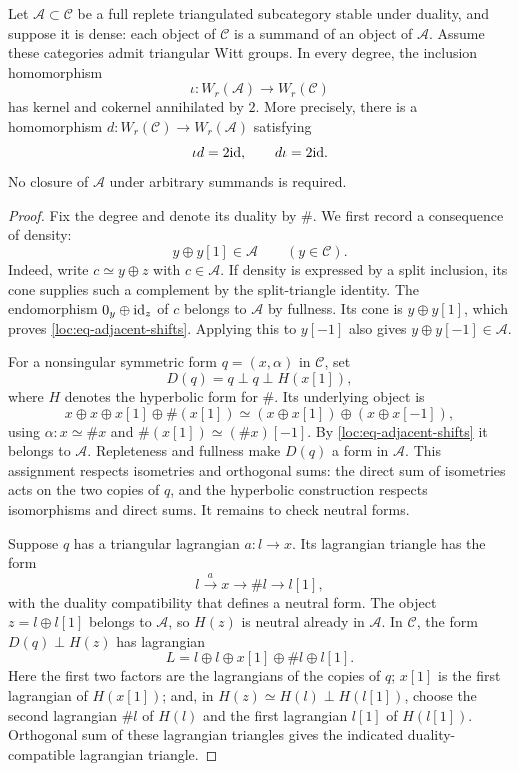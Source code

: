 \begin{theorem}
\label{thm:dense-doubling}
Let $\mathcal A\subset\mathcal C$ be a full replete triangulated
subcategory stable under duality, and suppose it is dense: each object
of $\mathcal C$ is a summand of an object of $\mathcal A$.
Assume these categories admit triangular Witt groups.  In every degree,
the inclusion homomorphism
\[
 \iota:W_r(\mathcal A)\longrightarrow W_r(\mathcal C)
\]
has kernel and cokernel annihilated by $2$.  More precisely, there is
a homomorphism
$d:W_r(\mathcal C)\to W_r(\mathcal A)$ satisfying
\[
 \iota d=2\mathrm{id},
 \qquad d\iota=2\mathrm{id}.
\]
No closure of $\mathcal A$ under arbitrary summands is required.
\end{theorem}

\begin{proof}
Fix the degree and denote its duality by $\#$.  We first record a
consequence of density:
\begin{equation}
\label{loc:eq-adjacent-shifts}
 y\oplus y[1]\in\mathcal A
 \qquad(y\in\mathcal C).
\end{equation}
Indeed, write $c\simeq y\oplus z$ with $c\in\mathcal A$.
If density is expressed by a split inclusion, its cone supplies such
a complement by the split-triangle identity.  The endomorphism
$0_y\oplus\mathrm{id}_z$ of $c$ belongs to $\mathcal A$ by fullness.
Its cone is $y\oplus y[1]$, which proves
\eqref{loc:eq-adjacent-shifts}.  Applying this to $y[-1]$ also gives
$y\oplus y[-1]\in\mathcal A$.

For a nonsingular symmetric form $q=(x,\alpha)$ in $\mathcal C$, set
\begin{equation}
\label{loc:eq-doubling-form}
 D(q)=q\perp q\perp H(x[1]),
\end{equation}
where $H$ denotes the hyperbolic form for $\#$.  Its underlying object
is
\[
 x\oplus x\oplus x[1]\oplus\#(x[1])
 \simeq (x\oplus x[1])\oplus(x\oplus x[-1]),
\]
using $\alpha:x\simeq\#x$ and
$\#(x[1])\simeq(\#x)[-1]$.
By \eqref{loc:eq-adjacent-shifts} it belongs to $\mathcal A$.
Repleteness and fullness make $D(q)$ a form in $\mathcal A$.
This assignment respects isometries and orthogonal sums: the direct
sum of isometries acts on the two copies of $q$, and the hyperbolic
construction respects isomorphisms and direct sums.  It remains to
check neutral forms.

Suppose $q$ has a triangular lagrangian $a:l\to x$.  Its lagrangian
triangle has the form
\[
 l\xrightarrow{a}x\longrightarrow\#l\longrightarrow l[1],
\]
with the duality compatibility that defines a neutral form.
The object $z=l\oplus l[1]$ belongs to $\mathcal A$, so $H(z)$ is
neutral already in $\mathcal A$.  In $\mathcal C$, the form
$D(q)\perp H(z)$ has lagrangian
\begin{equation}
\label{loc:eq-doubled-lagrangian}
 L=l\oplus l\oplus x[1]\oplus\#l\oplus l[1].
\end{equation}
Here the first two factors are the lagrangians of the copies of $q$;
$x[1]$ is the first lagrangian of $H(x[1])$; and, in
$H(z)\simeq H(l)\perp H(l[1])$, choose the second lagrangian $\#l$
of $H(l)$ and the first lagrangian $l[1]$ of $H(l[1])$.
Orthogonal sum of these lagrangian triangles gives the indicated
duality-compatible lagrangian triangle.


\end{proof}
